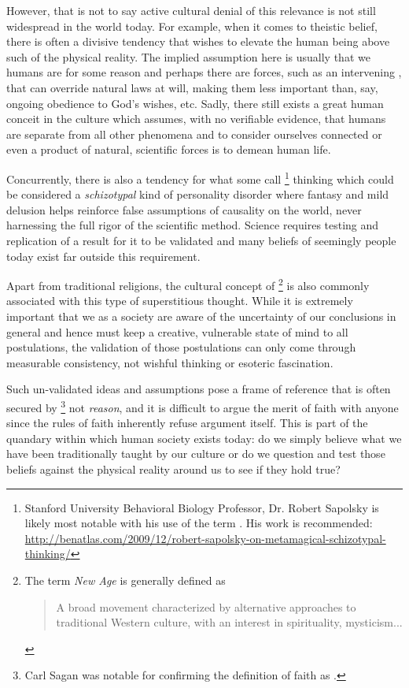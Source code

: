 \documentclass[10pt, a4paper, cleardoubleempty, openright, twoside]{book}
\begin{document}
However, that is not to say active cultural denial of this relevance is
not still widespread in the world today. For example, when it comes to
theistic belief, there is often a divisive tendency that wishes to
elevate the human being above such  of the
physical reality. The implied assumption here is usually that we humans
are  for some reason and perhaps there are forces,
such as an intervening , that can override natural laws
at will, making them less important than, say, ongoing obedience to
God's wishes, etc. Sadly, there still exists a great human conceit in
the culture which assumes, with no verifiable evidence, that humans are
separate from all other phenomena and to consider ourselves connected or
even a product of natural, scientific forces is to demean human life.

Concurrently, there is also a tendency for what some call
\footnote{
	Stanford University Behavioral Biology Professor, Dr. Robert Sapolsky
	is likely most notable with his use of the term
	. His work is recommended:
	\url{http://benatlas.com/2009/12/robert-sapolsky-on-metamagical-schizotypal-thinking/}
} 
thinking which could be considered a \emph{schizotypal} kind of
personality disorder where fantasy and mild delusion helps reinforce
false assumptions of causality on the world, never harnessing the full
rigor of the scientific method. Science requires testing and replication
of a result for it to be validated and many beliefs of seemingly
 people today exist far outside this requirement.

Apart from traditional religions, the cultural concept of \footnote{
	The term \emph{New Age} is generally defined as \blockquote{A broad
	movement characterized by alternative approaches to traditional
	Western culture, with an interest in spirituality, mysticism...}.
} 
is also commonly associated with this type of superstitious thought.
While it is extremely important that we as a society are aware of the
uncertainty of our conclusions in general and hence must keep a
creative, vulnerable state of mind to all postulations, the validation
of those postulations can only come through measurable consistency, not
wishful thinking or esoteric fascination.

Such un-validated ideas and assumptions pose a frame of reference that
is often secured by \footnote{
	Carl Sagan was notable for confirming the definition of faith as
	.
} 
not \emph{reason}, and it is difficult to argue the merit of faith with
anyone since the rules of faith inherently refuse argument itself. This
is part of the quandary within which human society exists today: do we
simply believe what we have been traditionally taught by our culture or
do we question and test those beliefs against the physical reality
around us to see if they hold true?
\end{document}
